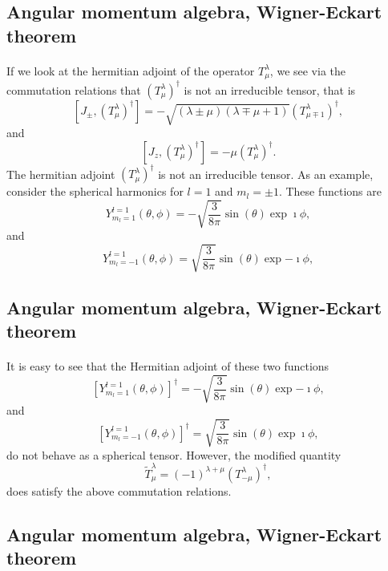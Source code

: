 \documentclass[%
twoside,                 %
final,                   %
10pt]{article}
\begin{document}
\subsection{Angular momentum algebra, Wigner-Eckart theorem}

\paragraph{}
If we look at the hermitian adjoint of the operator $T^{\lambda}_{\mu}$, 
we see via the commutation relations that $(T^{\lambda}_{\mu})^{\dagger}$ is not an irreducible tensor, that is
\[
[J_{\pm}, (T^{\lambda}_{\mu})^{\dagger}]= -\sqrt{(\lambda\pm \mu)(\lambda\mp \mu+1)}(T^{\lambda}_{\mu\mp 1})^{\dagger},
\]
and 
\[
[J_{z}, (T^{\lambda}_{\mu})^{\dagger}]=-\mu (T^{\lambda}_{\mu})^{\dagger}.
\]
The hermitian adjoint $(T^{\lambda}_{\mu})^{\dagger}$ is not an irreducible tensor. As an example, consider the spherical harmonics for 
$l=1$ and $m_l=\pm 1$. These functions are 
\[
Y^{l=1}_{m_l=1}(\theta,\phi)=-\sqrt{\frac{3}{8\pi}}\sin{(\theta)}\exp{\imath\phi},
\]
and
\[
Y^{l=1}_{m_l=-1}(\theta,\phi)=\sqrt{\frac{3}{8\pi}}\sin{(\theta)}\exp{-\imath\phi},
\]


\subsection{Angular momentum algebra, Wigner-Eckart theorem}

\paragraph{}
It is easy to see that the Hermitian adjoint of these two functions
\[
\left[Y^{l=1}_{m_l=1}(\theta,\phi)\right]^{\dagger}=-\sqrt{\frac{3}{8\pi}}\sin{(\theta)}\exp{-\imath\phi},
\]
and 
\[
\left[Y^{l=1}_{m_l=-1}(\theta,\phi)\right]^{\dagger}=\sqrt{\frac{3}{8\pi}}\sin{(\theta)}\exp{\imath\phi},
\]
do not behave as a spherical tensor. However, the modified quantity 
\[
\tilde{T}^{\lambda}_{\mu}=(-1)^{\lambda+\mu}(T^{\lambda}_{-\mu})^{\dagger},
\]
does satisfy the above commutation relations.


\subsection{Angular momentum algebra, Wigner-Eckart theorem}
\end{document}

